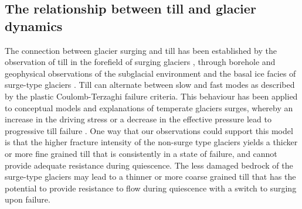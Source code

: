 \documentclass[review]{igs}
\begin{document}
\subsection{The relationship between till and glacier dynamics}

The connection between glacier surging and till has been established by the observation of till in the forefield of surging glaciers \citep[e.g.][]{Evans1999,Christoffersen2005,Sobota2016}, through borehole and geophysical observations of the subglacial environment \citep[e.g.][]{Blake1994,Porter1997,Harrison2003,Truffer2000} and the basal ice facies of surge-type glaciers \citep{Sharp1994}. Till can alternate between slow and fast modes as described by the plastic Coulomb-Terzaghi failure criteria. This behaviour has been applied to conceptual models and explanations of temperate glaciers surges, whereby an increase in the driving stress or a decrease in the effective pressure lead to progressive till failure \citep[e.g.][]{Boulton1979,Nolan2003}.
One way that our observations could support this model is that the higher fracture intensity of the non-surge type glaciers yields a thicker or more fine grained till \citep{Crompton2016} that is consistently in a state of failure, and cannot provide adequate resistance during quiescence. The less damaged bedrock of the surge-type glaciers may lead to a thinner or more coarse grained till that has the potential to provide resistance to flow during quiescence with a switch to surging upon failure. 
 
\end{document}
